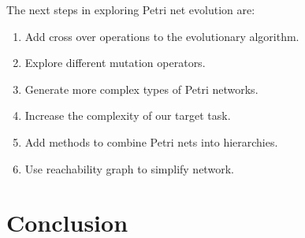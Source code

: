 \documentclass[12pt,a4paper,twocolumn]{article}
\begin{document}
The next steps in exploring Petri net evolution are:
\begin{enumerate}
\item Add cross over operations to the evolutionary algorithm.
\item Explore different mutation operators.
\item Generate more complex types of Petri networks.
\item Increase the complexity of our target task.
\item Add methods to combine Petri nets into hierarchies.
\item Use reachability graph to simplify network.
\end{enumerate}

\section{Conclusion}



\end{document}

